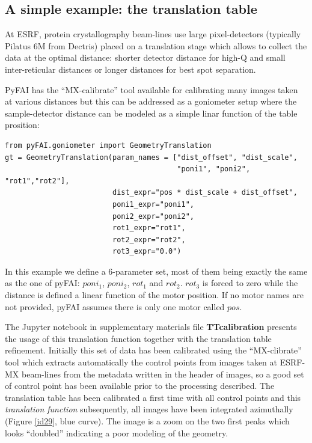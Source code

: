 \documentclass[preprint, pdf]{iucr}              %
\begin{document}
\subsection{A simple example: the translation table}

At ESRF, protein crystallography beam-lines use large pixel-detectors (typically
Pilatus 6M from Dectris) placed on a translation stage which allows to collect
the data at the optimal distance: shorter detector distance for high-Q and small
inter-reticular distances or longer distances for best spot separation.

PyFAI has the ``MX-calibrate'' tool available for calibrating many images taken
at various distances but this can be addressed as a goniometer setup where the
sample-detector distance can be modeled as a simple linar function of the table
prosition:

\begin{verbatim}
from pyFAI.goniometer import GeometryTranslation
gt = GeometryTranslation(param_names = ["dist_offset", "dist_scale", 
                                        "poni1", "poni2", "rot1","rot2"],
                         dist_expr="pos * dist_scale + dist_offset", 
                         poni1_expr="poni1",
                         poni2_expr="poni2", 
                         rot1_expr="rot1", 
                         rot2_expr="rot2", 
                         rot3_expr="0.0")
\end{verbatim}
 
In this example we define a 6-parameter set, most of them being exactly the same
as the one of pyFAI: $poni_1$, $poni_2$, $rot_1$ and $rot_2$. $rot_3$ is forced
to zero while the distance is defined a linear function of the motor position.
If no motor names are not provided, pyFAI assumes there is only one motor
called $pos$.

The Jupyter notebook \cite{ipython} in supplementary materials file
\textbf{TTcalibration} presents the usage of this translation function
together with the translation table refinement. 
Initially this set of data has been calibrated using the ``MX-clibrate'' tool
which extracts automatically the control points from images taken at ESRF-MX
beam-lines from the metadata written in the header of images, so a good set
of control point has been available prior to the processing described. 
The translation table has been calibrated a first time with all control points
and this \textit{translation function} subsequently, all images have been
integrated azimuthally (Figure \ref{id29}, blue curve). 
The image is a zoom on the two first peaks which looks ``doubled'' indicating a
poor modeling of the geometry.
\end{document}
